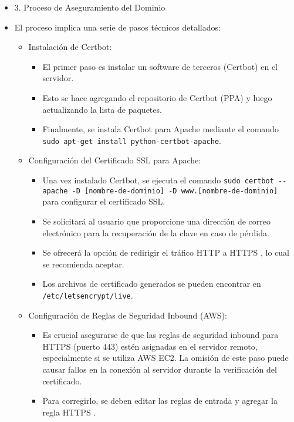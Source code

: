 \documentclass{report}
\begin{document}
\begin{itemize}
    \item 3. Proceso de Aseguramiento del Dominio
    \item El proceso implica una serie de pasos técnicos detallados:
    \begin{itemize}
        \item Instalación de Certbot:
        \begin{itemize}
            \item El primer paso es  instalar un software de terceros  (Certbot) en el servidor.
        \item Esto se hace agregando el repositorio de Certbot (PPA) y luego actualizando la lista de paquetes. 
            \item Finalmente, se instala Certbot para Apache mediante el comando \verb|sudo apt-get install python-certbot-apache|.
        \end{itemize}
        \item Configuración del Certificado SSL para Apache:
        \begin{itemize}
            \item Una vez instalado Certbot, se ejecuta el comando \verb|sudo certbot --apache -D [nombre-de-dominio] -D www.[nombre-de-dominio]| 
            para configurar el certificado SSL.
            \item Se solicitará al usuario que  proporcione una dirección de correo electrónico  para la recuperación de la clave en caso de pérdida.
            \item Se ofrecerá la opción de  redirigir el tráfico HTTP a HTTPS , lo cual se recomienda aceptar.
        \item Los archivos de certificado generados se pueden encontrar en \verb|/etc/letsencrypt/live|.
        \end{itemize}
        \item Configuración de Reglas de Seguridad Inbound (AWS):
        \begin{itemize}
            \item Es crucial asegurarse de que las  reglas de seguridad inbound para HTTPS (puerto 443)  estén asignadas en el servidor remoto, 
            especialmente si se utiliza AWS EC2. La omisión de este paso puede causar fallos en la conexión al servidor durante la verificación 
            del certificado.
            \item Para corregirlo, se deben editar las reglas de entrada y  agregar la regla HTTPS .        
        \end{itemize}

\end{itemize}
\end{itemize}
\end{document}

